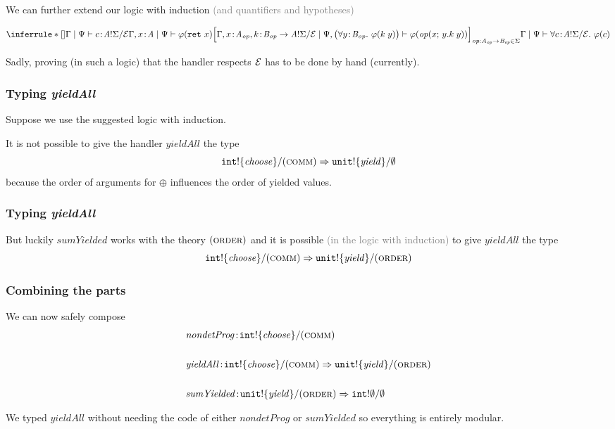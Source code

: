 \documentclass[usenames,dvipsnames]{beamer}
\begin{document}
\begin{frame}
	We can further extend our logic with induction \textcolor{gray}{(and quantifiers and hypotheses)}

	\[
		\inferrule*[]
		{
		\ljudgement{\ctx}{\hypo}{c \oftype \ctypebasic}
		\\
		\ljudgement{\ctx, x \oftype \tyA}{\hypo}{\varphi(\return x)}
		\\
		\Big[\ljudgement{\ctx, x \oftype \tyA_\op, k \oftype \tyB_\op \to \ctypebasic}
			{\hypo, \big(\fall{y \oftype \tyB_\op} \varphi(\apply{k}{y})\big)}{\varphi(\operation{x}{y.\apply{k}{y}})}\Big]
		_{\op : \tyA_\op \to \tyB_\op \in \sig}
		}
		{ \ljudgement{\ctx}{\hypo}{\fall{c \oftype \ctypebasic} \varphi(c)}
		}
	\]
	\vspace{5mm}

	Sadly, proving (in such a logic) that the handler respects $\mathcal{E}$ has to be done by hand (currently).

\end{frame}
\begin{frame}
	\frametitle{Typing \textit{yieldAll}}
	Suppose we use the suggested logic with induction.
	\vspace{5mm}

	It is not possible to give the handler $\mathit{yieldAll}$ the type
	\[
		\ctype{\inttype}{\set{\mathit{choose}}}{(\textsc{comm})} \hto \ctype{\unittype}{\set{\mathit{yield}}}{\nil}
	\]
	because the order of arguments for $\oplus$ influences the order of yielded values.
\end{frame}
\begin{frame}
	\frametitle{Typing \textit{yieldAll}}

	But luckily $\mathit{sumYielded}$ works with the theory $(\textsc{order})$ and it is possible \textcolor{gray}{(in the logic with induction)} to give $\mathit{yieldAll}$ the type 
	\[
		\ctype{\inttype}{\set{\mathit{choose}}}{(\textsc{comm})} \hto \ctype{\unittype}{\set{\mathit{yield}}}{(\textsc{order})}
	\]
\end{frame}
\begin{frame}
	\frametitle{Combining the parts}
	We can now safely compose
	\begin{align*}
		& \mathit{nondetProg} \oftype \ctype{\inttype}{\set{\mathit{choose}}}{(\textsc{comm})} \\ \\
		& \mathit{yieldAll} \oftype \ctype{\inttype}{\set{\mathit{choose}}}{(\textsc{comm})} \hto \ctype{\unittype}{\set{\mathit{yield}}}{(\textsc{order})} \\ \\
		& \mathit{sumYielded} \oftype \ctype{\unittype}{\set{\mathit{yield}}}{(\textsc{order})} \hto \ctype{\inttype}{\nil}{\nil}
	\end{align*}

	We typed $\mathit{yieldAll}$ without needing the code of either $\mathit{nondetProg}$ or $\mathit{sumYielded}$ so everything is entirely modular.
\end{frame}
\end{document}
